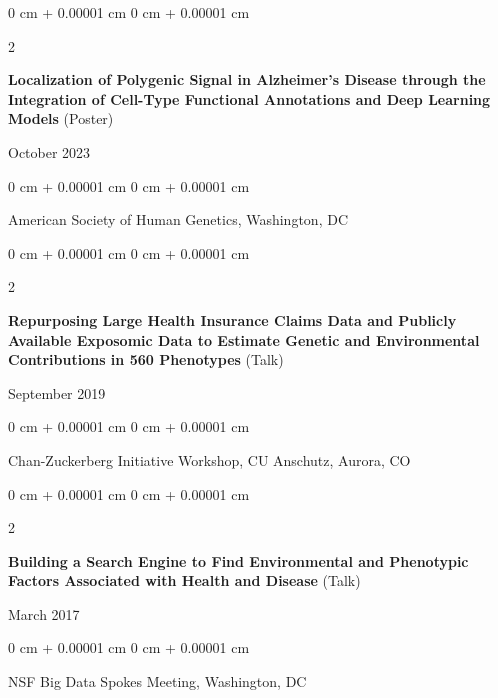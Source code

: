 \documentclass[10pt, letterpaper]{article}
\newenvironment{onecolentry}{
    \begin{adjustwidth}{
        0 cm + 0.00001 cm
    }{
        0 cm + 0.00001 cm
    }
}{
    \end{adjustwidth}
} %
\newenvironment{twocolentry}[2][]{
    \onecolentry
    \def\secondColumn{#2}
    \setcolumnwidth{\fill, 4.5 cm}
    \begin{paracol}{2}
}{
    \switchcolumn \raggedleft \secondColumn
    \end{paracol}
    \endonecolentry
} %
\begin{document}
    \vspace{0.20 cm}

    \begin{samepage}
        \begin{twocolentry}{
            October 2023
        }
            \textbf{Localization of Polygenic Signal in Alzheimer's Disease through the Integration of Cell-Type Functional Annotations and Deep Learning Models} (Poster)
        \end{twocolentry}

        \vspace{0.10 cm}

        \begin{onecolentry}
            American Society of Human Genetics, Washington, DC
        \end{onecolentry}
    \end{samepage}

    \vspace{0.20 cm}

    \begin{samepage}
        \begin{twocolentry}{
            September 2019
        }
            \textbf{Repurposing Large Health Insurance Claims Data and Publicly Available Exposomic Data to Estimate Genetic and Environmental Contributions in 560 Phenotypes} (Talk)
        \end{twocolentry}

        \vspace{0.10 cm}

        \begin{onecolentry}
            Chan-Zuckerberg Initiative Workshop, CU Anschutz, Aurora, CO
        \end{onecolentry}
    \end{samepage}

    \vspace{0.20 cm}

    \begin{samepage}
        \begin{twocolentry}{
            March 2017
        }
            \textbf{Building a Search Engine to Find Environmental and Phenotypic Factors Associated with Health and Disease} (Talk)
        \end{twocolentry}

        \vspace{0.10 cm}

        \begin{onecolentry}
            NSF Big Data Spokes Meeting, Washington, DC
        \end{onecolentry}
    \end{samepage}
\end{document}

